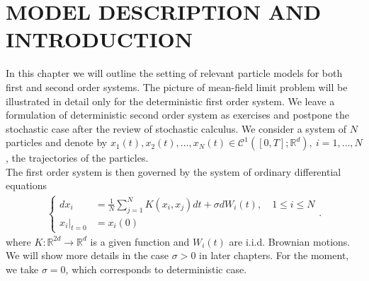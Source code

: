 \chapter{MODEL DESCRIPTION AND INTRODUCTION}
In this chapter we will outline the setting of relevant particle models for both first and second order systems. The picture of mean-field limit problem will be illustrated in detail only for the deterministic first order system. We leave a formulation of deterministic second order system as exercises and postpone the stochastic case after the review of stochastic calculus.
  We consider a system of $N$ particles and denote by $x_{1}(t),x_{2}(t),\ldots,x_N(t) \in  \mathcal{C}^{1}([0,T];\mathbb{R}^{d} ),\ i=1,\ldots ,N $,
  the trajectories of the particles.\\[1ex]
  The first order system is then governed by the system of ordinary differential equations 
  \begin{align*}
    \begin{cases}
      d x_i &= \frac{1}{N}\sum_{j=1}^{N} K(x_{i},x_{j}) dt + \sigma dW_i(t), \quad 1\le i \le N \\
        x_i\rvert_{t=0} &= x_i(0)
    \end{cases}
  .\end{align*}
  where $K : \mathbb{R}^{2d} \to \mathbb{R}^{d}  $ is a given function and $W_i(t)$ are i.i.d. Brownian motions. We will show more details in the case $\sigma>0$ in later chapters.
  For the moment, we take $\sigma  = 0$, which corresponds to deterministic case.\\[1ex]
  
